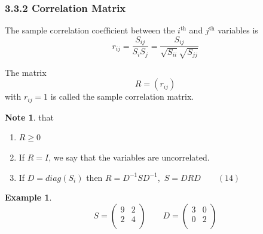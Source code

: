 \documentclass[11pt,a4paper]{article}
\theoremstyle{definition}
\newtheorem{exa}[thm]{Example}
\newtheorem{note}[thm]{Note}
\begin{document}
\subsubsection*{3.3.2 Correlation Matrix}
The sample correlation coefficient between the $i^{\text{th}}$ and $j^{\text{th}}$ variables is \begin{equation}\tag{12}
r_{ij}=\frac{S_{ij}}{S_iS_j}=\frac{S_{ij}}{\sqrt{S_{ii}}\sqrt{S_{jj}}}
\end{equation}

The matrix
\begin{equation}\tag{13}
R=(r_{ij})
\end{equation}
with $r_{ij}=1$ is called the sample correlation matrix.\\

\begin{note}
that
\end{note}
\begin{enumerate}
\item $R\geq 0$
\item If $R=I$, we say that the variables are uncorrelated.
\item If $D=diag(S_i)$ then $R=D^{-1}SD^{-1}$, $\, S=DRD\qquad (14)$\\
\end{enumerate}





\begin{exa}
$$S=
\begin{pmatrix}
9 & 2\\
2 & 4\\
\end{pmatrix}
\qquad 
D=
\begin{pmatrix}
3 & 0\\
0 & 2\\
\end{pmatrix}
$$
\end{exa}
\end{document}
